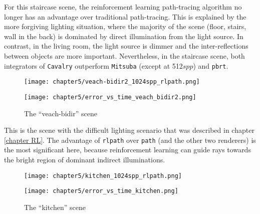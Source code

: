 For this staircase scene, the reinforcement learning path-tracing algorithm no longer has an advantage over traditional path-tracing. This is explained by the more forgiving lighting situation, where the majority of the scene (floor, stairs, wall in the back) is dominated by direct illumination from the light source. In contrast, in the living room, the light source is dimmer and the inter-reflections between objects are more important. Nevertheless, in the staircase scene, both integrators of \texttt{Cavalry} outperform \texttt{Mitsuba} (except at 512$spp$) and \texttt{pbrt}. 

\newpage
\begin{figure}[H]
    \centering
    
    \begin{minipage}[t]{.99\textwidth}
        \centering
        \vspace{0pt}
        \texttt{[image: chapter5/veach-bidir2\_1024spp\_rlpath.png]}
    \end{minipage}
    
    \vspace{0.3cm}

    \begin{minipage}[t]{.99\textwidth}
        \centering
        \vspace{0pt}
        \texttt{[image: chapter5/error\_vs\_time\_veach\_bidir2.png]}
    \end{minipage}
    
    \caption{The ``veach-bidir'' scene}
\end{figure}

This is the scene with the difficult lighting scenario that was described in chapter \ref{chapter RL}. The advantage of \texttt{rlpath} over \texttt{path} (and the other two renderers) is the most significant here, because reinforcement learning can guide rays towards the bright region of dominant indirect illuminations.


\newpage
\begin{figure}[H]
    \centering
    
    \begin{minipage}[t]{.99\textwidth}
        \centering
        \vspace{0pt}
        \texttt{[image: chapter5/kitchen\_1024spp\_rlpath.png]}
    \end{minipage}
    
    \vspace{0.3cm}

    \begin{minipage}[t]{.99\textwidth}
        \centering
        \vspace{0pt}
        \texttt{[image: chapter5/error\_vs\_time\_kitchen.png]}
    \end{minipage}
    
    \caption{The ``kitchen'' scene}
\end{figure}

